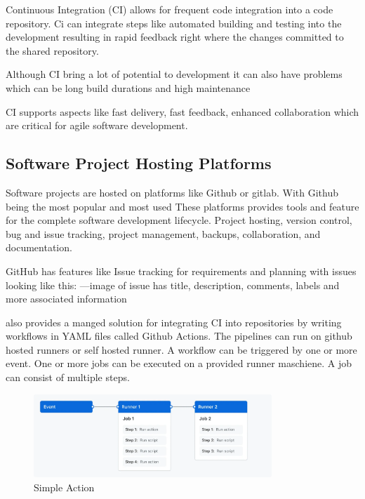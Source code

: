 Continuous Integration (CI) allows for frequent code integration into a code repository. Ci can integrate steps like automated building and testing into the development resulting in rapid feedback right where the changes committed to the shared repository.

Although CI bring a lot of potential to development it can also have problems which can be long build durations and high maintenance

CI supports aspects like fast delivery, fast feedback, enhanced collaboration which are critical for agile software development. \cite{ugwuezeContinuousIntegrationDeployment2024}

\subsection{Software Project Hosting Platforms}
Software projects are hosted on platforms like Github or gitlab. With Github being the most popular and most used %
These platforms provides tools and feature for the complete software development lifecycle. Project hosting, version control, bug and issue tracking, project management, backups, collaboration, and documentation. \cite{abrahamssonAgileSoftwareDevelopment2017}

GitHub has features like Issue tracking for requirements and planning with issues looking like this: %
---image of issue
has title, description, comments, labels and more associated information

also provides a manged solution for integrating CI into repositories by writing workflows in YAML files called Github Actions. The pipelines can run on github hosted runners or self hosted runner. A workflow can be triggered by one or more event. One or more jobs can be executed on a provided runner maschiene. A job can consist of multiple steps. \cite{Workflows}
\begin{figure}[htbp]
    \centering
    \includegraphics[width=0.8\textwidth]{images/overview-actions-simple.png}
    \caption{Simple Action}
    \label{fig:simple action}
\end{figure}

